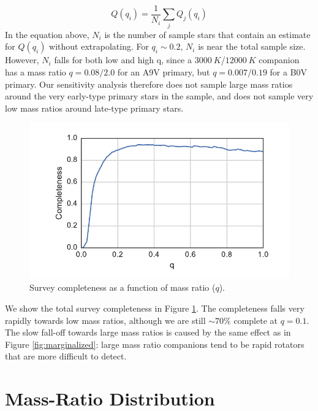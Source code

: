 \documentclass{emulateapj}
\begin{document}
\begin{equation}
Q(q_i) = \frac{1}{N_i} \sum_j Q_j(q_i)
\label{eqn:completeness}
\end{equation}
In the equation above, $N_i$ is the number of sample stars that contain an estimate for $Q(q_i)$ without extrapolating. For $q_i \sim 0.2$, $N_i$ is near the total sample size. However, $N_i$ falls for both low and high q, since a $3000\ K$/$12000\ K$ companion has a mass ratio $q = 0.08/2.0$ for an A9V primary, but $q = 0.007/0.19$ for a B0V primary. Our sensitivity analysis therefore does not sample large mass ratios around the very early-type primary stars in the sample, and does not sample very low mass ratios around late-type primary stars.


\begin{figure}
\includegraphics[width=\columnwidth]{SurveyCompleteness.pdf}
\caption{Survey completeness as a function of mass ratio ($q$).}
\label{fig:completeness}
\end{figure}

We show the total survey completeness in Figure \ref{fig:completeness}. The completeness falls very rapidly towards low mass ratios, although we are still $\sim 70\%$ complete at $q = 0.1$. The slow fall-off towards large mass ratios is caused by the same effect as in Figure \ref{fig:marginalized}: large mass ratio companions tend to be rapid rotators that are more difficult to detect.

\section{Mass-Ratio Distribution}
\label{sec:mrd}
\end{document}

